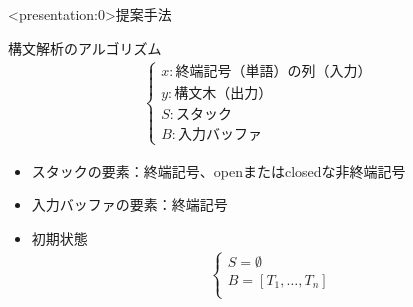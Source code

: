 \documentclass[aspectratio=43,unicode,10pt]{beamer}
\newcommand{\term}{終端記号}
\newcommand{\nt}{非終端記号}
\begin{document}
\begin{frame}<presentation:0>{提案手法}
  \begin{block}{構文解析のアルゴリズム}
    \begin{gather*}
      \begin{cases}
        x: \text{\term （単語）の列（入力）} \\
        y: \text{構文木（出力）} \\
        S: \text{スタック} \\
        B: \text{入力バッファ}
      \end{cases}
    \end{gather*}
    \begin{itemize}
      \item スタックの要素：\term、openまたはclosedな\nt
      \item 入力バッファの要素：\term
      \item 初期状態
        \begin{gather*}
          \begin{cases}
            S = \emptyset \\
            B = [T_1, \ldots, T_n] \\
          \end{cases}
        \end{gather*}
    \end{itemize}
  \end{block}
\end{frame}
\end{document}
